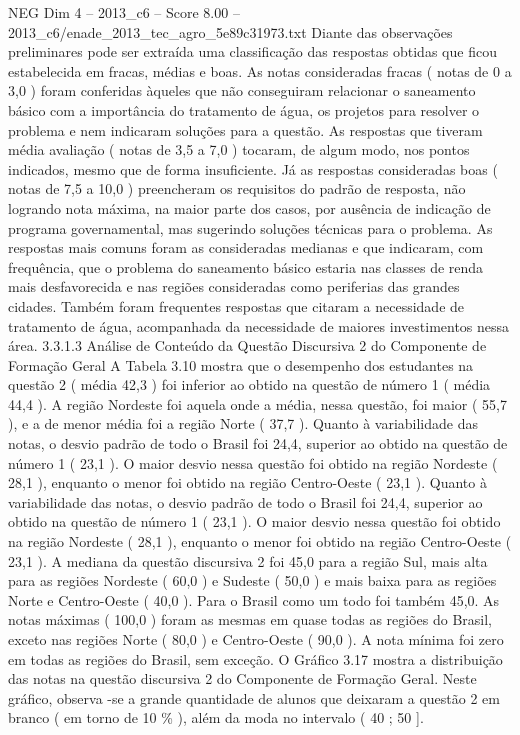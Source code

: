 \begin{textsample}{NEG Dim 4 – 2013\_c6 – Score 8.00 – 2013\_c6/enade\_2013\_tec\_agro\_5e89c31973.txt}
Diante das observações preliminares pode ser extraída uma classificação das respostas obtidas que ficou estabelecida em fracas, médias e boas.
As notas consideradas fracas ( notas de 0 a 3,0 ) foram conferidas àqueles que não conseguiram relacionar o saneamento básico com a importância do tratamento de água, os projetos para resolver o problema e nem indicaram soluções para a questão.
As respostas que tiveram média avaliação ( notas de 3,5 a 7,0 ) tocaram, de algum modo, nos pontos indicados, mesmo que de forma insuficiente.
Já as respostas consideradas boas ( notas de 7,5 a 10,0 ) preencheram os requisitos do padrão de resposta, não logrando nota máxima, na maior parte dos casos, por ausência de indicação de programa governamental, mas sugerindo soluções técnicas para o problema.
As respostas mais comuns foram as consideradas medianas e que indicaram, com frequência, que o problema do saneamento básico estaria nas classes de renda mais desfavorecida e nas regiões consideradas como periferias das grandes cidades.
Também foram frequentes respostas que citaram a necessidade de tratamento de água, acompanhada da necessidade de maiores investimentos nessa área. 3.3.1.3 Análise de Conteúdo da Questão Discursiva 2 do Componente de Formação Geral A Tabela 3.10 mostra que o desempenho dos estudantes na questão 2 ( média 42,3 ) foi inferior ao obtido na questão de número 1 ( média 44,4 ).
A região Nordeste foi aquela onde a média, nessa questão, foi maior ( 55,7 ), e a de menor média foi a região Norte ( 37,7 ).
Quanto à variabilidade das notas, o desvio padrão de todo o Brasil foi 24,4, superior ao obtido na questão de número 1 ( 23,1 ).
O maior desvio nessa questão foi obtido na região Nordeste ( 28,1 ), enquanto o menor foi obtido na região Centro-Oeste ( 23,1 ).
Quanto à variabilidade das notas, o desvio padrão de todo o Brasil foi 24,4, superior ao obtido na questão de número 1 ( 23,1 ).
O maior desvio nessa questão foi obtido na região Nordeste ( 28,1 ), enquanto o menor foi obtido na região Centro-Oeste ( 23,1 ).
A mediana da questão discursiva 2 foi 45,0 para a região Sul, mais alta para as regiões Nordeste ( 60,0 ) e Sudeste ( 50,0 ) e mais baixa para as regiões Norte e Centro-Oeste ( 40,0 ).
Para o Brasil como um todo foi também 45,0.
As notas máximas ( 100,0 ) foram as mesmas em quase todas as regiões do Brasil, exceto nas regiões Norte ( 80,0 ) e Centro-Oeste ( 90,0 ).
A nota mínima foi zero em todas as regiões do Brasil, sem exceção.
O Gráfico 3.17 mostra a distribuição das notas na questão discursiva 2 do Componente de Formação Geral.
Neste gráfico, observa -se a grande quantidade de alunos que deixaram a questão 2 em branco ( em torno de 10 \% ), além da moda no intervalo ( 40 ; 50 ].

\end{textsample}
